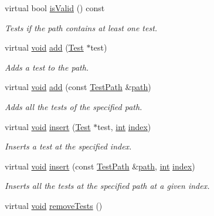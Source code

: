 \begin{DoxyCompactItemize}
\item 
virtual bool \hyperlink{class_test_path_aca6ad4784df09af24573890d2d145435}{is\-Valid} () const 
\begin{DoxyCompactList}\small\item\em Tests if the path contains at least one test. \end{DoxyCompactList}\item 
virtual \hyperlink{wglew_8h_aeea6e3dfae3acf232096f57d2d57f084}{void} \hyperlink{class_test_path_a0a8a6273d18f76da2c7e2dedf61b3f7b}{add} (\hyperlink{class_test}{Test} $\ast$test)
\begin{DoxyCompactList}\small\item\em Adds a test to the path. \end{DoxyCompactList}\item 
virtual \hyperlink{wglew_8h_aeea6e3dfae3acf232096f57d2d57f084}{void} \hyperlink{class_test_path_a679447e57ea80c9a767a41f0b723b427}{add} (const \hyperlink{class_test_path}{Test\-Path} \&\hyperlink{glew_8h_ae517c090b864e6b2846c380c4125f4c5}{path})
\begin{DoxyCompactList}\small\item\em Adds all the tests of the specified path. \end{DoxyCompactList}\item 
virtual \hyperlink{wglew_8h_aeea6e3dfae3acf232096f57d2d57f084}{void} \hyperlink{class_test_path_a6591fc81038f8b29e64becbfe1e2f740}{insert} (\hyperlink{class_test}{Test} $\ast$test, \hyperlink{wglew_8h_a500a82aecba06f4550f6849b8099ca21}{int} \hyperlink{fmod__codec_8h_a57f14e05b1900f16a2da82ade47d0c6d}{index})
\begin{DoxyCompactList}\small\item\em Inserts a test at the specified index. \end{DoxyCompactList}\item 
virtual \hyperlink{wglew_8h_aeea6e3dfae3acf232096f57d2d57f084}{void} \hyperlink{class_test_path_af107ea8a2ce40414e1d59a05c6deec0c}{insert} (const \hyperlink{class_test_path}{Test\-Path} \&\hyperlink{glew_8h_ae517c090b864e6b2846c380c4125f4c5}{path}, \hyperlink{wglew_8h_a500a82aecba06f4550f6849b8099ca21}{int} \hyperlink{fmod__codec_8h_a57f14e05b1900f16a2da82ade47d0c6d}{index})
\begin{DoxyCompactList}\small\item\em Inserts all the tests at the specified path at a given index. \end{DoxyCompactList}\item 
virtual \hyperlink{wglew_8h_aeea6e3dfae3acf232096f57d2d57f084}{void} \hyperlink{class_test_path_a98bbd84f8dea8793cfda496ecea1be75}{remove\-Tests} ()

\end{DoxyCompactItemize}
